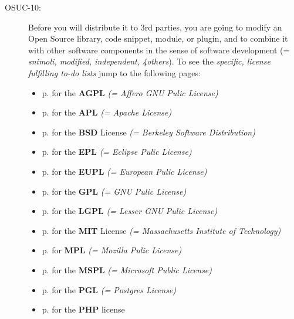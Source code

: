 \begin{description}
\item[OSUC-10:]\label{OSUC-10-DEF} Before you will distribute it to 3rd parties,
you are going to modify an Open Source library, code snippet, module, or plugin,
and to combine it with other software components in the sense of
software development (= \textit{snimoli, modified, independent, 4others}). 
To see the \textit{specific, license fulfilling to-do lists} jump to the
following pages:
  \begin{itemize}
    \item p. \pageref{OSUC-10-AGPL} for the \textbf{AGPL}
      \textit{(= Affero GNU Pulic License)} 
    \item p. \pageref{OSUC-10-Apache20} for the \textbf{APL}
      \textit{(= Apache License)}
    \item p. \pageref{OSUC-10-BSD} for the \textbf{BSD} License
      \textit{(= Berkeley Software Distribution)}
    \item p. \pageref{OSUC-10-EPL} for the \textbf{EPL}
      \textit{(= Eclipse Pulic License)}     
    \item p. \pageref{OSUC-10-EUPL} for the \textbf{EUPL}
      \textit{(= European Pulic License)} 
    \item p. \pageref{OSUC-10-GPL} for the \textbf{GPL}
       \textit{(= GNU Pulic License)} 
    \item p. \pageref{OSUC-10-LGPL} for the \textbf{LGPL}
      \textit{(= Lesser GNU Pulic License)}           
    \item p. \pageref{OSUC-10-MIT} for the \textbf{MIT} License
       \textit{(= Massachusetts Institute of Technology)} 
    \item p. \pageref{OSUC-10-MPL} for \textbf{MPL}
      \textit{(= Mozilla Pulic License)}     
    \item p. \pageref{OSUC-10-MsPL} for the \textbf{MSPL}
      \textit{(= Microsoft Public License)} 
    \item p. \pageref{OSUC-10-PGL} for the \textbf{PGL}
      \textit{(= Postgres License)} 
    \item p. \pageref{OSUC-10-PHP} for the \textbf{PHP} license 
  \end{itemize}

\end{description}

%
